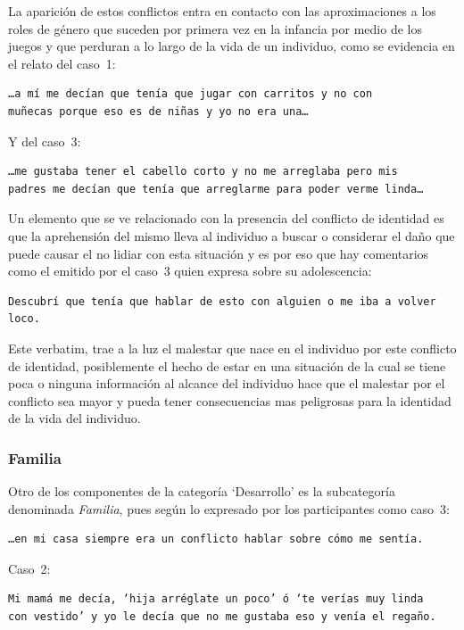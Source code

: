 La aparición de estos conflictos entra en contacto con las aproximaciones a los
roles de género que suceden por primera vez en la infancia por medio de los
juegos y que perduran a lo largo de la vida de un individuo, como se evidencia
en el relato del caso~1:

\begin{verbatim}
…a mí me decían que tenía que jugar con carritos y no con
muñecas porque eso es de niñas y yo no era una…
\end{verbatim}

Y del caso~3:

\begin{verbatim}
…me gustaba tener el cabello corto y no me arreglaba pero mis
padres me decían que tenía que arreglarme para poder verme linda…
\end{verbatim}

 Un elemento que se ve relacionado con la presencia del conflicto de identidad
 es que la aprehensión del mismo lleva al individuo a buscar o considerar el
 daño que puede causar el no lidiar con esta situación y es por eso que hay
 comentarios como el emitido por el caso~3 quien expresa sobre su
 adolescencia:

 \begin{verbatim}
Descubrí que tenía que hablar de esto con alguien o me iba a volver loco.
 \end{verbatim}

 Este verbatim, trae a la luz el malestar que nace en el individuo por este
 conflicto de identidad, posiblemente el hecho de estar en una situación de la
 cual se tiene poca o ninguna información al alcance del individuo hace que el
 malestar por el conflicto sea mayor y pueda tener consecuencias mas peligrosas
 para la identidad de la vida del individuo.

\subsubsection{Familia}

Otro de los componentes de la categoría ‘Desarrollo’ es la subcategoría
denominada \emph{Familia}, pues según lo expresado por los participantes como
caso~3:

\begin{verbatim}
…en mi casa siempre era un conflicto hablar sobre cómo me sentía.
\end{verbatim}

Caso~2:

\begin{verbatim}
Mi mamá me decía, ‘hija arréglate un poco’ ó ‘te verías muy linda
con vestido’ y yo le decía que no me gustaba eso y venía el regaño.
\end{verbatim}

